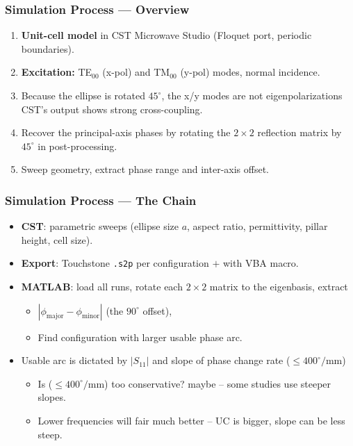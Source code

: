 \documentclass[aspectratio=43]{beamer}
\begin{document}
\begin{frame}[fragile]
  \frametitle{Simulation Process --- Overview}
  \begin{enumerate}
    \item \textbf{Unit-cell model} in CST Microwave Studio
      (Floquet port, periodic boundaries).
    \item \textbf{Excitation:} TE$_{00}$ (x-pol) and TM$_{00}$ (y-pol) modes,
      normal incidence.
    \item Because the ellipse is rotated $45^\circ$, the x/y modes are not eigenpolarizations CST's output shows strong cross-coupling.
    \item Recover the principal-axis phases by rotating the
      $2\times2$ reflection matrix by $45^\circ$ in post-processing.
    \item Sweep geometry, extract phase range and inter-axis offset.
  \end{enumerate}
\end{frame}

\begin{frame}[fragile]
  \frametitle{Simulation Process --- The Chain}
  \begin{itemize}
    \item \textbf{CST}: parametric sweeps (ellipse size $a$, aspect ratio,
      permittivity, pillar height, cell size).
    \item \textbf{Export}: Touchstone \texttt{.s2p} per configuration $+$ with VBA macro.
    \item \textbf{MATLAB}: load all runs, rotate each $2\times2$ matrix to the
      eigenbasis, extract
      \begin{itemize}
        \item $|\phi_{\mathrm{major}} - \phi_{\mathrm{minor}}|$ (the $90^\circ$ offset),
        \item Find configuration with larger usable phase arc.
      \end{itemize}
    \item Usable arc is dictated by  $|S_{11}|$ and slope of phase change rate ($\leq 400^\circ/\mathrm{mm}$)
      \begin{itemize}
        \item Is ($\leq 400^\circ/\mathrm{mm}$) too conservative? maybe -- some studies use steeper slopes.
        \item Lower frequencies will fair much better -- UC is bigger, slope can be less steep.
      \end{itemize}

  \end{itemize}
\end{frame}
\end{document}
